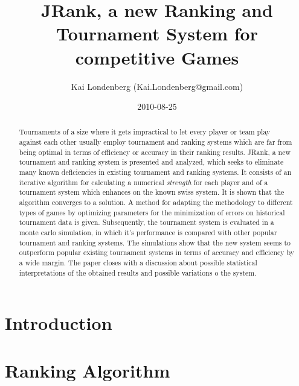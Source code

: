 \documentclass[a4paper]{article}
\title{JRank, a new Ranking and Tournament System for competitive Games}
\author{Kai Londenberg (Kai.Londenberg@gmail.com)}
\date{2010-08-25}
\begin{document}
\maketitle

\begin{abstract}

Tournaments of a size where it gets impractical to let every player or team play against each other usually employ tournament and ranking systems which are
far from being optimal in terms of efficiency or accuracy in their ranking results. JRank, a new tournament and ranking system is presented and analyzed, which
seeks to eliminate many known deficiencies in existing tournament and ranking systems. It consists of an iterative algorithm for calculating a numerical 
\textit{strength} for each player and of a tournament system which enhances on the known swiss system. It is shown that the algorithm converges to a solution.
A method for adapting the methodology to different types of games by optimizing parameters for the minimization of errors on historical tournament data is given.
Subsequently, the tournament system is evaluated in a monte carlo simulation, in which it's performance is compared with other popular tournament
and ranking systems. The simulations show that the new system seems to outperform popular existing tournament systems in terms of accuracy and efficiency by 
a wide margin. The paper closes with a discussion about possible statistical interpretations of the obtained results and possible variations o the system.

\end{abstract}

\section*{Introduction}



\section*{Ranking Algorithm}
\end{document}
